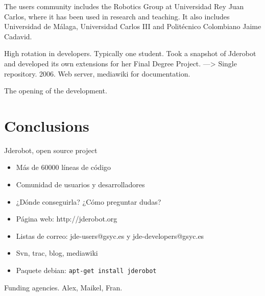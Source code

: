 \documentclass[twocolumn]{svjour3}          %
\begin{document}
The users community includes the Robotics Group at Universidad Rey Juan Carlos, where it has been used in research and teaching. It also includes Universidad de Málaga, Universidad Carlos III and Politécnico Colombiano Jaime Cadavid.

High rotation in developers. Typically one student. Took a snapshot of Jderobot and developed its own extensions for her Final Degree Project. ---> Single repository. 2006. Web server, mediawiki for documentation.

The opening of the development.

\section{Conclusions}

Jderobot, open source project
\begin{itemize}
\item Más de 60000 líneas de código
\item Comunidad de usuarios y desarrolladores
\item ¿Dónde conseguirla? ¿Cómo preguntar dudas? 
\item Página web: {http://jderobot.org}
\item Listas de correo: jde-users@gsyc.es y jde-developers@gsyc.es
\item Svn, trac, blog, mediawiki
\item Paquete debian: \texttt{apt-get install jderobot}
\end{itemize}

\begin{acknowledgements}
Funding agencies. Alex, Maikel, Fran.
\end{acknowledgements}

\end{document}
